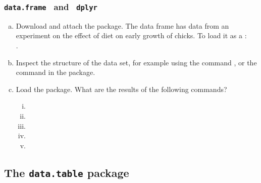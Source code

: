 \documentclass{beamer}
\begin{document}
\begin{frame}%
 \frametitle{\texttt{data.frame } and \texttt{ dplyr}}
 
	\begin{myexc}
	\fontsize{9pt}{11}\selectfont
        \begin{enumerate}[(a)]
	        \item
	        Download and attach the  package. The  data frame has data from an experiment on the effect of diet on early growth of chicks. To load it as a :\\
	        .
	        \item
	        Inspect the structure of the data set, for example using the command , or the command  in the  package.
	        \item
	        Load the  package. What are the results of the following commands?
	        \begin{enumerate}[(i)]
	            \item
	            \item
	            \item
	            \item
	            \item
	        \end{enumerate}
        \end{enumerate}
        
	\addtocounter{exccounter}{1}
	\end{myexc}
 
\end{frame}




\subsection{The \small\texttt{data.table} \normalsize package}
\end{document}

